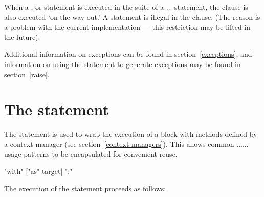 When a ,  or  statement is
executed in the  suite of a ...
statement, the  clause is also executed `on the way out.' A
 statement is illegal in the  clause.
(The reason is a problem with the current implementation --- this
restriction may be lifted in the future).

Additional information on exceptions can be found in
section~\ref{exceptions}, and information on using the 
statement to generate exceptions may be found in section~\ref{raise}.


\section{The  statement\label{with}}


The  statement is used to wrap the execution of a block
with methods defined by a context manager (see
section~\ref{context-managers}). This allows common
...... usage patterns to
be encapsulated for convenient reuse.

\begin{productionlist}
  {"with"  ["as" target] ":" }
\end{productionlist}

The execution of the  statement proceeds as follows:

